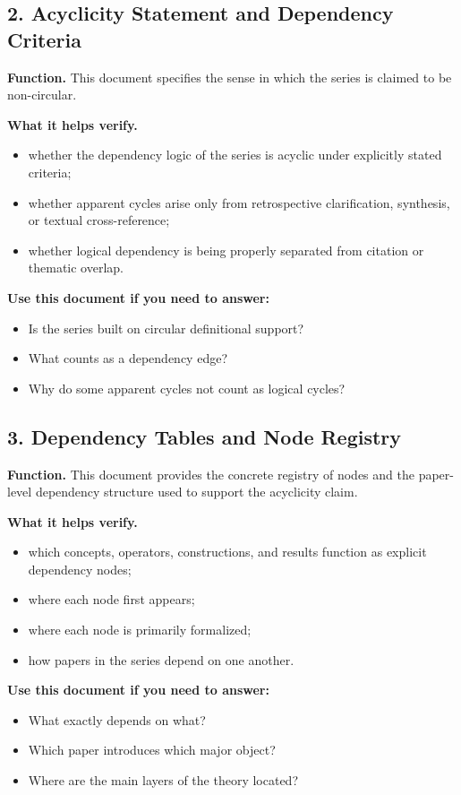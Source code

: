 \documentclass[11pt,a4paper]{article}
\begin{document}
\subsection{2. Acyclicity Statement and Dependency Criteria}

\textbf{Function.}  
This document specifies the sense in which the series is claimed to be non-circular.

\textbf{What it helps verify.}
\begin{itemize}[leftmargin=2em]
	\item whether the dependency logic of the series is acyclic under explicitly stated criteria;
	\item whether apparent cycles arise only from retrospective clarification, synthesis, or textual
	cross-reference;
	\item whether logical dependency is being properly separated from citation or thematic overlap.
\end{itemize}

\textbf{Use this document if you need to answer:}
\begin{itemize}[leftmargin=2em]
	\item Is the series built on circular definitional support?
	\item What counts as a dependency edge?
	\item Why do some apparent cycles not count as logical cycles?
\end{itemize}

\subsection{3. Dependency Tables and Node Registry}

\textbf{Function.}  
This document provides the concrete registry of nodes and the paper-level dependency structure
used to support the acyclicity claim.

\textbf{What it helps verify.}
\begin{itemize}[leftmargin=2em]
	\item which concepts, operators, constructions, and results function as explicit dependency nodes;
	\item where each node first appears;
	\item where each node is primarily formalized;
	\item how papers in the series depend on one another.
\end{itemize}

\textbf{Use this document if you need to answer:}
\begin{itemize}[leftmargin=2em]
	\item What exactly depends on what?
	\item Which paper introduces which major object?
	\item Where are the main layers of the theory located?
\end{itemize}
\end{document}
